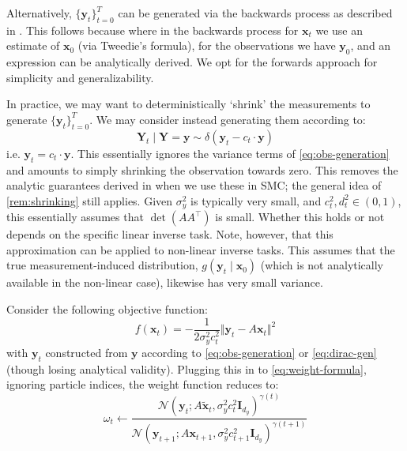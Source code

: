 \begin{remark}
    Alternatively, $\{\mathbf{y}_t\}_{t=0}^T$ can be generated via the backwards process as
    described in \textcite{douDiffusionPosteriorSampling2023}. This follows because where in the
    backwards process for $\mathbf{x}_t$ we use an estimate of $\mathbf{x}_0$ (via Tweedie's
    formula), for the observations we have $\mathbf{y}_0$, and an expression can be analytically
    derived. We opt for the forwards approach for simplicity and generalizability.
\end{remark}

\begin{remark} \label{rem:dirac-generation}
    In practice, we may want to deterministically `shrink' the measurements to generate
    $\{\mathbf{y}_t\}_{t=0}^T$. We may consider instead generating them according to:
    \begin{equation}
        \mathbf{Y}_t \mid \mathbf{Y} = \mathbf{y} \sim \delta(\mathbf{y}_t - c_t\cdot \mathbf{y}) \label{eq:dirac-gen}
    \end{equation}
    i.e. $\mathbf{y}_t = c_t\cdot \mathbf{y}$. This essentially ignores the variance terms of
    \ref{eq:obs-generation} and amounts to simply shrinking the observation towards zero.
    This removes the analytic guarantees derived in
    \textcite{douDiffusionPosteriorSampling2023} when we use these in SMC; the general idea of
    \ref{rem:shrinking} still applies. Given $\sigma_y^2$ is typically very small, and
    $c_t^2,d_t^2 \in (0,1)$, this essentially assumes that $\det(AA^\top)$ is small. Whether this
    holds or not depends on the specific linear inverse task. Note, however, that this approximation
    can be applied to non-linear inverse tasks. This assumes that the true measurement-induced
    distribution, $g(\mathbf{y}_t \mid \mathbf{x}_0)$ (which is not analytically available in the
    non-linear case), likewise has very small variance.
\end{remark}

\begin{proposition}
    Consider the following objective function:
    \begin{equation}
        f(\mathbf{x}_t) = -\frac{1}{2\sigma_y^2c_t^2}\Vert\mathbf{y}_t - A\mathbf{x}_t\Vert^2 \label{eq:inverse-objective}
    \end{equation}
    with $\mathbf{y}_t$ constructed from $\mathbf{y}$ according to \ref{eq:obs-generation} or
    \ref{eq:dirac-gen} (though losing analytical validity). Plugging this in to
    \ref{eq:weight-formula}, ignoring particle indices, the weight function reduces to:
    \begin{equation}
        \omega_t \gets \frac{\mathcal{N}(\mathbf{y}_t; A\tilde{\mathbf{x}}_t, \sigma_y^2c_t^2\mathbf{I}_{d_y})^{\gamma(t)}}{\mathcal{N}(\mathbf{y}_{t+1}; A\mathbf{x}_{t+1}, \sigma_y^2c_{t+1}^2\mathbf{I}_{d_y})^{\gamma(t+1)}} \label{eq:weight-formula-inverse}
    \end{equation}
\end{proposition}


